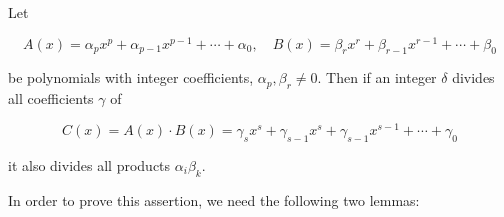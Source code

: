 Let

$$A(x) = \alpha_p x^p + \alpha_{p-1} x^{p-1} + \cdots + \alpha_0, \quad B(x) = \beta_r x^r + \beta_{r-1} x^{r-1} + \cdots + \beta_0$$

be polynomials with integer coefficients, $\alpha_p, \beta_r \neq 0$. Then if an integer $\delta$ divides all coefficients $\gamma$ of

$$C(x) = A(x) \cdot B(x) = \gamma_s x^s + \gamma_{s-1} x^s + \gamma_{s-1} x^{s-1} + \cdots + \gamma_0$$

it also divides all products $\alpha_i \beta_k$.

In order to prove this assertion, we need the following two lemmas:
